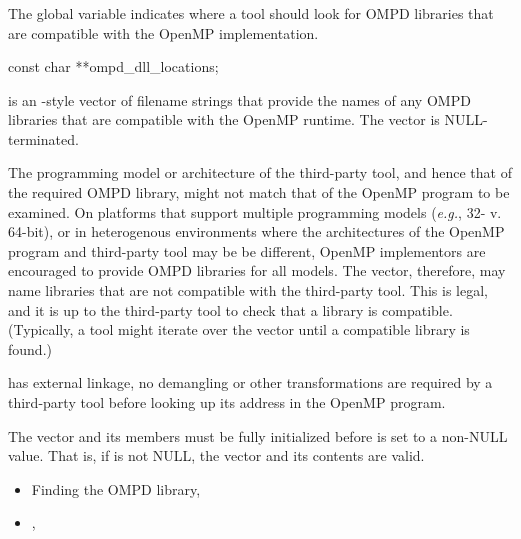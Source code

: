 \subsubsection{}
\label{subsubsec:ompd_dll_locations}

\summary
The global variable  indicates
where a tool should look for OMPD libraries that are compatible
with the OpenMP implementation.

\begin{cspecific}
\begin{ompSyntax}
const char **ompd_dll_locations;
\end{ompSyntax}
\end{cspecific}


\descr
{} is an -style vector of filename
strings that provide the names of any OMPD libraries
that are compatible with the OpenMP runtime.
The vector is NULL-terminated.

The programming model or architecture of the third-party tool, and
hence that of the required OMPD library, might not match that of
the OpenMP program to be examined.
On platforms that support multiple programming models (\textit{e.g.},
32- v. 64-bit), or in heterogenous  environments where the architectures
of the OpenMP program and third-party tool may be be different,
OpenMP implementors are encouraged to provide OMPD libraries for all models.
The vector, therefore, may name libraries that are not compatible
with the third-party tool.
This is legal, and it is up to the third-party tool to check that
a library is compatible.
(Typically, a tool might iterate over the vector until a compatible
library is found.)

\restrictions
{} has external  linkage,
no demangling or other transformations are required by a third-party
tool before looking up its address in the OpenMP program.

The vector and its members must be fully initialized before
 is set to a non-NULL value.
That is, if  is not NULL, the vector
and its contents are valid.

\crossreferences
\begin{itemize}
\item
  Finding the OMPD library, 
\item
  , 
\end{itemize}

